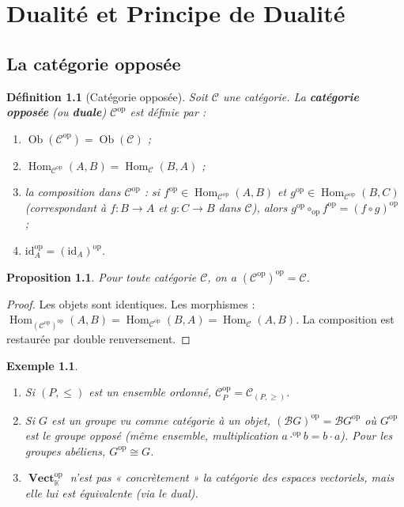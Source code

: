 \documentclass[a4paper,12pt]{book}
\DeclareMathOperator{\Hom}{Hom}
\DeclareMathOperator{\Ob}{Ob}
\DeclareMathOperator{\Vect}{\mathbf{Vect}}
\newcommand{\op}{\mathrm{op}}
\newcommand{\id}{\mathrm{id}}
\newcommand{\K}{\mathbb{K}}
\newtheorem{proposition}[theoreme]{Proposition}
\newtheorem{definition}[theoreme]{Définition}
\newtheorem{exemple}[theoreme]{Exemple}
\begin{document}
\chapter{Dualité et Principe de Dualité}
\minitoc

\section{La catégorie opposée}

\begin{definition}[Catégorie opposée]\label{def:cat-opposee}
\index{$\mathcal{C}^{\op}$}
Soit $\mathcal{C}$ une catégorie. La \textbf{catégorie opposée} (ou \textbf{duale}) $\mathcal{C}^{\op}$ est définie par :
\begin{enumerate}[label=(\roman*)]
  \item $\Ob(\mathcal{C}^{\op}) = \Ob(\mathcal{C})$ ;
  \item $\Hom_{\mathcal{C}^{\op}}(A, B) = \Hom_{\mathcal{C}}(B, A)$ ;
  \item la composition dans $\mathcal{C}^{\op}$ : si $f^{\op} \in \Hom_{\mathcal{C}^{\op}}(A,B)$ et $g^{\op} \in \Hom_{\mathcal{C}^{\op}}(B,C)$ (correspondant à $f : B \to A$ et $g : C \to B$ dans $\mathcal{C}$), alors $g^{\op} \circ_{\op} f^{\op} = (f \circ g)^{\op}$ ;
  \item $\id_A^{\op} = (\id_A)^{\op}$.
\end{enumerate}
\end{definition}

\begin{proposition}\label{prop:cop-cop}
Pour toute catégorie $\mathcal{C}$, on a $(\mathcal{C}^{\op})^{\op} = \mathcal{C}$.
\end{proposition}

\begin{proof}
Les objets sont identiques. Les morphismes : $\Hom_{(\mathcal{C}^{\op})^{\op}}(A,B) = \Hom_{\mathcal{C}^{\op}}(B,A) = \Hom_\mathcal{C}(A,B)$. La composition est restaurée par double renversement.
\end{proof}

\begin{exemple}\label{ex:cop-exemples}
\begin{enumerate}[label=(\alph*)]
  \item Si $(P, \leq)$ est un ensemble ordonné, $\mathcal{C}_P^{\op} = \mathcal{C}_{(P, \geq)}$.
  \item Si $G$ est un groupe vu comme catégorie à un objet, $(\mathcal{B}G)^{\op} = \mathcal{B}G^{\op}$ où $G^{\op}$ est le groupe opposé (même ensemble, multiplication $a \cdot^{\op} b = b \cdot a$). Pour les groupes abéliens, $G^{\op} \cong G$.
  \item $\Vect_\K^{\op}$ n'est pas « concrètement » la catégorie des espaces vectoriels, mais elle lui est équivalente (via le dual).
\end{enumerate}
\end{exemple}
\end{document}
